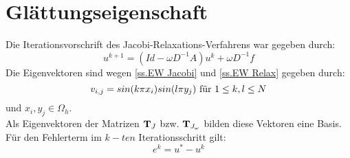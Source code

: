 






\section{Glättungseigenschaft}\label{s.Glättungseigenschaft}

Die Iterationsvorschrift des Jacobi-Relaxations-Verfahrens war gegeben durch:
\begin{equation}
u^{k+1} = (Id - \omega D^{-1}A)u^{k} + \omega D^{-1}f
\end{equation}
Die Eigenvektoren sind wegen \autoref{ss.EW Jacobi} und \autoref{ss.EW Relax} gegeben durch:
\begin{equation}
v_{i,j} = sin(k \pi x_{i})sin(l \pi y_{j}) \textnormal{ für } 1 \le k,l \le N
\end{equation}
und $x_{i}, y_{j} \in \Omega_{h}$. \\
Als Eigenvektoren der Matrizen ${\textbf{T}}_{J}$ bzw. ${\textbf{T}}_{J_{\omega}}$ bilden diese Vektoren eine Basis.
Für den Fehlerterm im $k-ten$ Iterationsschritt gilt:
\begin{equation}
e^{k} = u^{*} - u^{k}
\end{equation}

